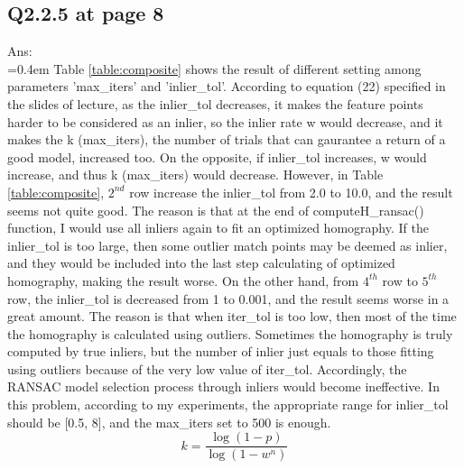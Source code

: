 \documentclass{article}
\begin{document}
	\subsection*{Q2.2.5 at page 8}
	Ans:\\
	\hangindent=0.4em \hspace{0.3em} Table \ref{table:composite} shows the result of different setting among parameters 'max\_iters' and 'inlier\_tol'. According to equation (22) specified in the slides of lecture, as the inlier\_tol decreases, it makes the feature points harder to be considered as an inlier, so the inlier rate w would decrease, and it makes the k (max\_iters), the number of trials that can gaurantee a return of a good model, increased too. On the opposite, if inlier\_tol increases, w would increase, and thus k (max\_iters) would decrease. However, in Table \ref{table:composite}, $2^{nd}$ row increase the inlier\_tol from 2.0 to 10.0, and the result seems not quite good. The reason is that at the end of computeH\_ransac() function, I would use all inliers again to fit an optimized homography. If the inlier\_tol is too large, then some outlier match points may be deemed as inlier, and they would be included into the last step calculating of optimized homography, making the result worse. On the other hand, from $4^{th}$ row to $5^{th}$ row, the inlier\_tol is decreased from 1 to 0.001, and the result seems worse in a great amount. The reason is that when iter\_tol is too low, then most of the time the homography is calculated using outliers. Sometimes the homography is truly computed by true inliers, but the number of inlier just equals to those fitting using outliers because of the very low value of iter\_tol. Accordingly, the RANSAC model selection process through inliers would become ineffective. In this problem,  according to my experiments, the appropriate range for inlier\_tol should be [0.5, 8], and the max\_iters set to 500 is enough.
	\begin{equation}
	k = \frac{\log(1 - p)}{\log(1 - w^n)}
	\end{equation}	
\end{document}
